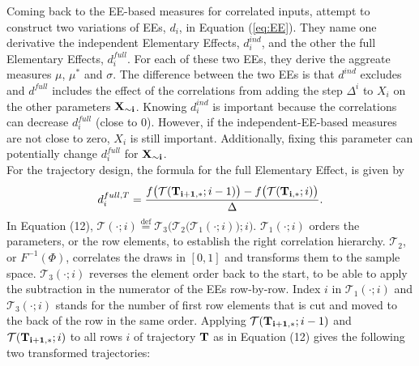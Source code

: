 \documentclass[a4paper,12pt]{article}
\newcommand*{\defeq}{\stackrel{\text{def}}{=}}
\begin{document}
Coming back to the EE-based measures for correlated inputs, \cite{ge2017extending} attempt to construct two variations of EEs, $d_i$, in Equation (\ref{eq:EE}). They name one derivative the independent Elementary Effects, $d_i^{ind}$, and the other the full Elementary Effects, $d_i^{full}$. For each of these two EEs, they derive the aggreate measures $\mu$, $\mu^*$ and $\sigma$. The difference between the two EEs is that $d^{ind}$ excludes and $d^{full}$ includes the effect of the correlations from adding the step $\Delta^i$ to $X_i$ on the other parameters $\bold{X_{\sim i}}$. Knowing $d_i^{ind}$ is important because the correlations can decrease $d_i^{full}$ (close to 0). However, if the independent-EE-based measures are not close to zero, $X_i$ is still important. Additionally, fixing this parameter can potentially change $d_i^{full}$ for $\bold{X_{\sim i}}$.\\

\noindent 
For the trajectory design, the formula for the full Elementary Effect, is given by
\begin{align}
d_i^{full,T} = \frac{f\big(\mathcal{T}(\bold{T_{i+1,*}}; i-1)\big) - f\big(\mathcal{T}(\bold{T_{i,*}}; i)\big)}{\Delta}.
\end{align}
In Equation (12), $\mathcal{T}(\cdot; i) \defeq \mathcal{T}_3\bigg(\mathcal{T}_2\big(\mathcal{T}_1(\cdot; i)\big); i\bigg)$. $\mathcal{T}_1(\cdot; i)$ orders the parameters, or the row elements, to establish the right correlation hierarchy. $\mathcal{T}_2$, or $F^{-1}(\Phi)$, correlates the draws in $[0,1]$ and transforms them to the sample space. $\mathcal{T}_3(\cdot; i)$ reverses the element order back to the start, to be able to apply the subtraction in the numerator of the EEs row-by-row. Index $i$ in $\mathcal{T}_1(\cdot; i)$ and $\mathcal{T}_3(\cdot; i)$ stands for the number of first row elements that is cut and moved to the back of the row in the same order. Applying $\mathcal{T}(\bold{T_{i+1,*}}; i-1)$ and $\mathcal{T}(\bold{T_{i+1,*}}; i)$ to all rows $i$ of trajectory $\bold{T}$ as in Equation (12) gives the following two transformed trajectories:
\end{document}
